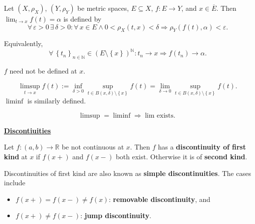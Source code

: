\documentclass{notes}
\begin{document}
  \begin{defn}
    Let $(X, \rho_X)$, $(Y, \rho_Y)$ be metric spaces, $E \subseteq X$, $f \colon E \to Y$, and $x \in \overline E$.
    Then $\lim_{t \to x} f(t) = \alpha$ is defined by 
    \[
      \forall \, \varepsilon > 0 \, \exists \, \delta > 0: \forall \, x \in E \land 0 < \rho_X(t, x) < \delta \Rightarrow \rho_Y(f(t), \alpha) < \varepsilon.
    \]
    
    Equivalently, 
    \[ 
      \forall \, \left \{ t_n \right \}_{n \in \mathbb N} \in (E \setminus \left \{ x \right \})^\mathbb N: t_n \to x \Rightarrow f(t_n) \to \alpha.
    \]

    \begin{note}
      $f$ need not be defined at $x$.
    \end{note}
  \end{defn}
  
  \begin{rmk}
    \[
      \limsup_{t \to x} f(t) := \inf_{\delta > 0} \sup_{t \in B(x, \delta) \setminus \left \{ x \right \}} f(t) = \lim_{\delta \to 0} \sup_{t \in B(x, \delta) \setminus \left \{ x \right \}} f(t).
    \]
    $\liminf$ is similarly defined.
  \end{rmk}
  
  \begin{rmk}
    \[
      \limsup = \liminf \Rightarrow \text{$\lim$ exists.}
    \]
  \end{rmk}
  
  \underline{{\boldmath \bfseries Discontiuities}}
  
  \begin{defn}
    Let $f \colon (a, b) \to \mathbb R$ be not continuous at $x$. Then $f$ has a {\boldmath \bfseries discontinuity of first kind} at $x$ if $f(x+)$ and $f(x-)$ both exist.
    Otherwise it is of {\boldmath \bfseries second kind}.
  \end{defn}
  
  \begin{rmk}
    Discontinuities of first kind are also known as {\boldmath \bfseries simple discontinuities}.
    The cases include 
    \begin{itemize}
      \item $f(x+) = f(x-) \neq f(x)$: {\boldmath \bfseries removable discontinuity}, and  

      \item $f(x+) \neq f(x-)$: {\boldmath \bfseries jump discontinuity}.
    \end{itemize}
  \end{rmk}
  
\end{document}
